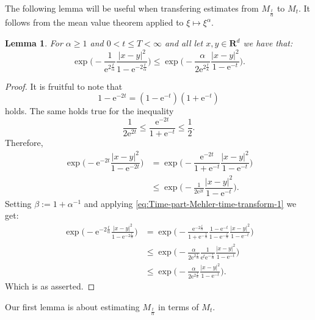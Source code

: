\documentclass[a4paper,oneside,10pt]{amsproc}
\newtheorem{lemma}{Lemma}
\theoremstyle{remark}
\renewcommand{\leq}{\leqslant}
\renewcommand{\leq}{\leqslant}
\renewcommand{\geq}{\geqslant}
\newcommand{\R}{\mathbf R}
\newcommand{\e}{\mathrm{e}} %
\renewcommand{\leq}{\leqslant}%
\renewcommand{\geq}{\geqslant}%
\begin{document}
The following lemma will be useful when transfering estimates from
$M_{\frac{t}{\alpha}}$ to $M_t$. It follows from the mean value
theorem applied to $\xi \mapsto \xi^\alpha$.
\begin{lemma}\label{lem:Exponential-estimates}
  For $\alpha \geq 1$ and $0 < t \leq T < \infty$ and all let $x, y \in \R^d$
  we have that:
  \begin{equation}
    \label{eq:Exponential-estimates-1}
    \exp \biggl (-\frac1{\e^{2\frac{t}\alpha}} \frac{|x - y|^2}{1 - \e^{-2\frac{t}\alpha}}
    \biggr ) \leq \exp \biggl(-\frac{\alpha}{2\e^{2\frac{t}\kappa}} \frac{|x -
      y|^2}{1 - \e^{-t}} \biggr).
  \end{equation}
\end{lemma}
\begin{proof}
  It is fruitful to note that
  \begin{equation*}
    1 - \e^{-2t} = (1 - \e^{-t})(1 + \e^{-t})
  \end{equation*}
  holds. The same holds true for the inequality
  \begin{equation*}
    \frac1{2 \e^{2t}} \leq \frac{\e^{-2t}}{1 + \e^{-t}} \leq \frac12.
  \end{equation*}
  Therefore,
  \begin{align*}
    \exp\biggl(-\e^{-2t} \dfrac{|x - y|^2}{1 - \e^{-2 t}} \biggr)
    &= \exp\biggl(-\dfrac{\e^{-2t}}{1 + \e^{-t}} \dfrac{|x -
      y|^2}{1 - \e^{-t}} \biggr)\\
    &\leq \exp\biggl(-\frac1{2\e^{2t}} \dfrac{|x - y|^2}{1 - \e^{-t}} \biggr).
  \end{align*}
  Setting $\beta := 1 + \alpha^{-1}$ and applying \eqref{eq:Time-part-Mehler-time-transform-1} we get:
  \begin{align*}
    \exp \biggl (-\e^{-2\frac{t}\alpha} \frac{|x - y|^2}{1 - \e^{-2\frac{t}\alpha}}
    \biggr ) &= \exp \biggl (-\frac{\e^{-2\frac{t}\alpha}}{1 + \e^{-\frac{t}\alpha}} \frac{1 - \e^{-t}}{1 -
      \e^{-\frac{t}\alpha}}  \frac{|x - y|^2}{1 - \e^{-t}} \biggr )\\
    &\leq \exp \biggl(-\frac{\alpha}{2\e^{2\frac{t}{\alpha}}}
    \frac1{\e^t \e^{-\frac{t}\alpha}} \frac{|x - y|^2}{1 - \e^{-t}}
    \biggr)\\
    &\leq \exp \biggl(-\frac{\alpha}{2\e^{2\frac{t}\kappa}} \frac{|x -
      y|^2}{1 - \e^{-t}} \biggr).
  \end{align*}
  Which is as asserted.
\end{proof}
Our first lemma is about estimating $M_{\frac{t}\alpha}$ in terms of
$M_{t}$.
\end{document}
